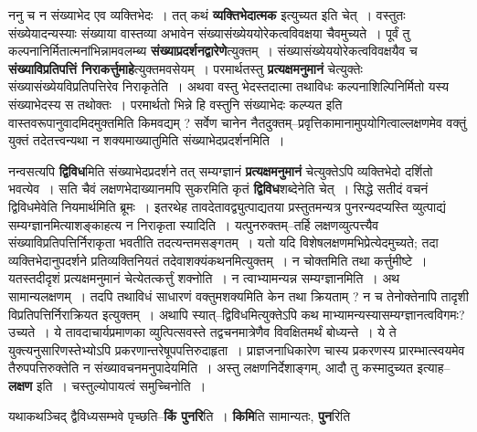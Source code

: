 \documentclass[article,12pt,a4paper]{memoir}
\begin{document}
	  \pstart ननु च न संख्याभेद एव व्यक्तिभेदः । तत् कथं \textbf{व्यक्तिभेदात्मक} इत्युच्यत इति चेत् । वस्तुतः संख्येयादन्यस्याः संख्याया वास्तव्या अभावेन संख्यासंख्येययोरेकत्वविवक्षया चैवमुच्यते । पूर्वं तु कल्पनानिर्मितात्मनांभिन्नामवलम्ब्य \textbf{संख्याप्रदर्शनद्वारेणे}त्युक्तम् । संख्यासंख्येययोरेकत्वविवक्षयैव च \textbf{संख्याविप्रतिपत्तिं निराकर्त्तुमाहे}त्युक्तमवसेयम् । परमार्थतस्तु \textbf{प्रत्यक्षमनुमानं} चेत्युक्तेः संख्यासंख्येयविप्रतिपत्तिरेव निराकृतेति । अथवा वस्तु भेदस्तदात्मा तथाविधः कल्पनाशिल्पिनिर्मितो यस्य संख्याभेदस्य स तथोक्तः । परमार्थतो भिन्ने हि वस्तुनि संख्याभेदः कल्प्यत इति वास्तवरूपानुवादमिदमुक्तमिति किमवद्यम् ? सर्वेण चानेन नैतदुक्तम्--प्रवृत्तिकामानामुपयोगित्वाल्लक्षणमेव वक्तुं युक्तं तदेतत्त्वन्यथा न शक्यमाख्यातुमिति संख्याभेदप्रदर्शनमिति ।
	\pend
      

	  \pstart नन्वसत्यपि \textbf{द्विविध}मिति संख्याभेदप्रदर्शने तत् सम्यग्ज्ञानं \textbf{प्रत्यक्षमनुमानं} चेत्युक्तेऽपि व्यक्तिभेदो दर्शितो भवत्येव । सति चैवं लक्षणभेदाख्यानमपि सुकरमिति कृतं \textbf{द्विविध}शब्देनेति चेत् । सिद्धे सतीदं वचनं द्विविधमेवेति नियमार्थमिति ब्रूमः । इतरथेह तावदेतावद्व्युत्पाद्यतया प्रस्तुतमन्यत्र पुनरन्यदप्यस्ति व्युत्पाद्यं सम्यग्ज्ञानमित्याशङ्काहत्य न निराकृता स्यादिति । यत्पुनरुक्तम्--तर्हि लक्षणव्युत्पत्त्यैव संख्याविप्रतिपत्तिर्निराकृता भवतीति तदत्यन्तमसङ्गतम् । यतो यदि विशेषलक्षणमभिप्रेत्येदमुच्यते; तदा व्यक्तिभेदानुपदर्शने प्रतिव्यक्तिनियतं तदेवाशक्यंकथनमित्युक्तम् । न चोक्तमिति तथा कर्त्तुमीष्टे । यतस्तदीदृशं प्रत्यक्षमनुमानं चेत्येतत्कर्त्तुं शक्नोति । न त्वाभ्यामन्यन्न सम्यग्ज्ञानमिति । अथ सामान्यलक्षणम् । तदपि तथाविधं साधारणं वक्तुमशक्यमिति केन तथा क्रियताम् ? न च तेनोक्तेनापि तादृशी विप्रतिपत्तिर्निराक्रियत इत्युक्तम् । अथापि स्यात्--द्विविधमित्युक्तेऽपि कथ \leavevmode{} माभ्यामन्यस्यासम्यग्ज्ञानत्वविगमः? उच्यते । ये तावदाचार्यप्रमाणका व्युत्पित्सवस्ते तद्वचनमात्रेणैव विवक्षितमर्थं बोध्यन्ते । ये ते युक्त्यनुसारिणस्तेभ्योऽपि प्रकरणान्तरेषूपपत्तिरुदाहृता । प्राज्ञजनाधिकारेण चास्य प्रकरणस्य प्रारम्भात्स्वयमेव तैरुपपत्तिरुक्तेति न संख्यावचनमनुपादेयमिति । अस्तु लक्षणनिर्देशाङ्गम्, आदौ तु कस्मादुच्यत इत्याह--\textbf{लक्षण} इति । चस्तुल्योपायत्वं समुच्चिनोति ।
	\pend
      

	  \pstart यथाकथञ्चिद् द्वैविध्यसम्भवे पृच्छति--\textbf{किं पुनरि}ति । \textbf{किमि}ति सामान्यतः, \textbf{पुन}रिति \leavevmode{} 
	  
\end{document}
